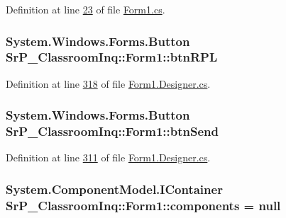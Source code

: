 \-Definition at line \hyperlink{_form1_8cs_source_l00023}{23} of file \hyperlink{_form1_8cs_source}{\-Form1.\-cs}.

\hypertarget{class_sr_p___classroom_inq_1_1_form1_a92767c7c3fd6f7c6890a4aa3bd2efefa}{
\subsubsection[{btn\-R\-P\-L}]{\setlength{\rightskip}{0pt plus 5cm}\-System.\-Windows.\-Forms.\-Button {\bf \-Sr\-P\-\_\-\-Classroom\-Inq\-::\-Form1\-::btn\-R\-P\-L}}}
\label{class_sr_p___classroom_inq_1_1_form1_a92767c7c3fd6f7c6890a4aa3bd2efefa}


\-Definition at line \hyperlink{_form1_8_designer_8cs_source_l00318}{318} of file \hyperlink{_form1_8_designer_8cs_source}{\-Form1.\-Designer.\-cs}.

\hypertarget{class_sr_p___classroom_inq_1_1_form1_a1e5e8dfae30625b2a45b24a75a966514}{
\subsubsection[{btn\-Send}]{\setlength{\rightskip}{0pt plus 5cm}\-System.\-Windows.\-Forms.\-Button {\bf \-Sr\-P\-\_\-\-Classroom\-Inq\-::\-Form1\-::btn\-Send}}}
\label{class_sr_p___classroom_inq_1_1_form1_a1e5e8dfae30625b2a45b24a75a966514}


\-Definition at line \hyperlink{_form1_8_designer_8cs_source_l00311}{311} of file \hyperlink{_form1_8_designer_8cs_source}{\-Form1.\-Designer.\-cs}.

\hypertarget{class_sr_p___classroom_inq_1_1_form1_accb63125f3efaee7cf29bc694431d352}{
\subsubsection[{components}]{\setlength{\rightskip}{0pt plus 5cm}\-System.\-Component\-Model.\-I\-Container {\bf \-Sr\-P\-\_\-\-Classroom\-Inq\-::\-Form1\-::components} = null}}
\label{class_sr_p___classroom_inq_1_1_form1_accb63125f3efaee7cf29bc694431d352}


